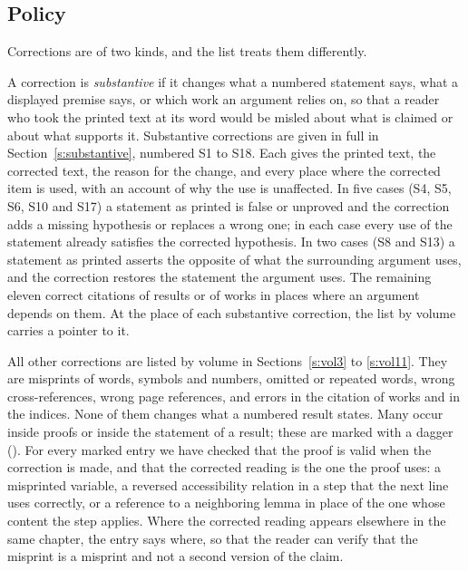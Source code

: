 \documentclass{situationist-preprint}
\begin{document}
\subsection{Policy}

Corrections are of two kinds, and the list treats them differently.

A correction is \emph{substantive} if it changes what a numbered statement says, what a displayed premise says, or which work an argument relies on, so that a reader who took the printed text at its word would be misled about what is claimed or about what supports it. Substantive corrections are given in full in Section~\ref{s:substantive}, numbered S1 to S18. Each gives the printed text, the corrected text, the reason for the change, and every place where the corrected item is used, with an account of why the use is unaffected. In five cases (S4, S5, S6, S10 and S17) a statement as printed is false or unproved and the correction adds a missing hypothesis or replaces a wrong one; in each case every use of the statement already satisfies the corrected hypothesis. In two cases (S8 and S13) a statement as printed asserts the opposite of what the surrounding argument uses, and the correction restores the statement the argument uses. The remaining eleven correct citations of results or of works in places where an argument depends on them. At the place of each substantive correction, the list by volume carries a pointer to it.

All other corrections are listed by volume in Sections~\ref{s:vol3} to \ref{s:vol11}. They are misprints of words, symbols and numbers, omitted or repeated words, wrong cross-references, wrong page references, and errors in the citation of works and in the indices. None of them changes what a numbered result states. Many occur inside proofs or inside the statement of a result; these are marked with a dagger (\dag). For every marked entry we have checked that the proof is valid when the correction is made, and that the corrected reading is the one the proof uses: a misprinted variable, a reversed accessibility relation in a step that the next line uses correctly, or a reference to a neighboring lemma in place of the one whose content the step applies. Where the corrected reading appears elsewhere in the same chapter, the entry says where, so that the reader can verify that the misprint is a misprint and not a second version of the claim.
\end{document}
